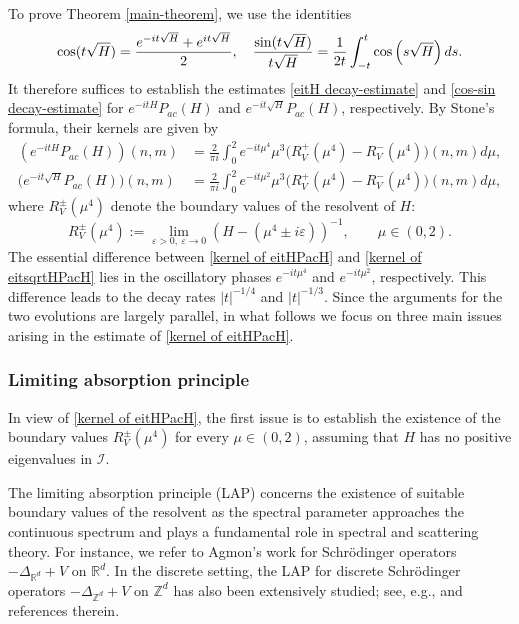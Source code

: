 \documentclass[reqno, 11pt]{amsart}
\newcommand\R{\mathbb{R}}
\newcommand\Z{\mathbb{Z}}
\newcommand\mcaI{\mathcal{I}}
\numberwithin{equation}{section}
\begin{document}
To prove Theorem \ref{main-theorem}, we use the identities
 \begin{equation*}
{\rm cos}(t\sqrt H)=\frac{e^{-it\sqrt H}+e^{it\sqrt H}}{2},\quad \frac{{\rm sin}(t\sqrt H)}{t\sqrt H}=\frac{1}{2t}\int_{-t}^{t}{\rm cos}\left(s\sqrt H\right)ds.
\end{equation*}
 It therefore suffices to establish the estimates \eqref{eitH decay-estimate} and \eqref{cos-sin decay-estimate} for $e^{-itH}P_{ac}(H)$ and $e^{-it\sqrt H}P_{ac}(H)$, respectively. By Stone's formula, their kernels are given by
\begin{align}
(e^{-itH}P_{ac}(H))(n,m)&=\frac{2}{\pi i}\int_{0}^{2}e^{-it\mu^4}\mu^3\big(R^{+}_V(\mu^4)-R^{-}_V(\mu^4)\big)(n,m)d\mu,\label{kernel of eitHPacH}\\
\big(e^{-it\sqrt H}P_{ac}(H)\big)(n,m)&=\frac{2}{\pi i}\int_{0}^{2}e^{-it\mu^2}\mu^3\big(R^{+}_V(\mu^4)-R^{-}_V(\mu^4)\big)(n,m)d\mu,\label{kernel of eitsqrtHPacH}
\end{align}
where $R^{\pm}_{V}(\mu^4)$  denote the boundary values of the resolvent of $H$:
\begin{equation*}
  R^{\pm}_{V}(\mu^4):=\lim\limits_{\varepsilon>0,\ \varepsilon\rightarrow0}(H-(\mu^4\pm i\varepsilon ))^{-1},\qquad\mu\in(0,2).
  \end{equation*}
The essential difference between \eqref{kernel of eitHPacH} and
\eqref{kernel of eitsqrtHPacH} lies in the oscillatory phases
$e^{-it\mu^4}$ and $e^{-it\mu^2}$, respectively. This difference leads to the decay rates $|t|^{-1/4}$ and $|t|^{-1/3}$. Since the arguments for the two evolutions are largely parallel, in what follows we focus on three main issues arising in the estimate of \eqref{kernel of eitHPacH}.
\subsubsection{Limiting absorption principle}\label{subsubsection of LAP}
In view of \eqref{kernel of eitHPacH}, the first issue is to establish the existence of the boundary values $R_V^\pm(\mu^4)$ for every $\mu\in(0,2)$, assuming that $H$ has no positive eigenvalues in $\mcaI$.

The limiting absorption principle (LAP) concerns the existence of suitable boundary values of the resolvent as the spectral parameter approaches the continuous spectrum and plays a fundamental role in spectral and scattering theory. For instance, we refer to Agmon's work \cite{Agm75} for Schr\"odinger operators $-\Delta_{\R^d}+V$ on $\R^d$. In the discrete setting, the LAP for discrete Schr\"odinger operators $-\Delta_{\Z^d}+V$ on $\Z^d$ has also been extensively studied; see, e.g., \cite{Esk67,SV01,BS98,BS99,KKK06,KKV08,IK12,Man17,PS08,TT19} and references therein.
\end{document}
